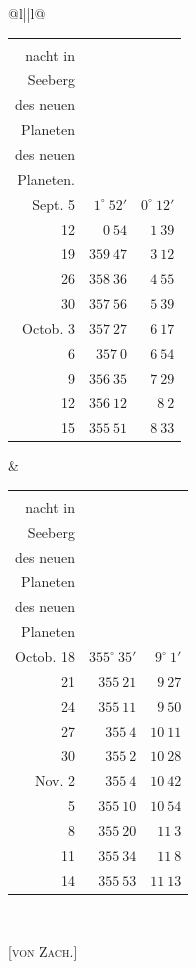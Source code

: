 \begin{center}
\begingroup\fontsize{8.5}{10.5}\selectfont\setlength{\tabcolsep}{2pt}\renewcommand{\arraystretch}{1.12}
\begin{tabular}{@{}l||l@{}}
\begin{tabular}{@{}r|r|r@{}}
\shortstack{Mitter-\\nacht in\\Seeberg} & \shortstack{Gerade Aufst.\\des neuen\\Planeten} & \shortstack{Südl. Abw.\\des neuen\\Planeten.} \\ \hline
Sept. 5 & $1^\circ\ 52'$ & $0^\circ\ 12'$ \\
12 & $0\ 54$ & $1\ 39$ \\
19 & $359\ 47$ & $3\ 12$ \\
26 & $358\ 36$ & $4\ 55$ \\
30 & $357\ 56$ & $5\ 39$ \\
Octob. 3 & $357\ 27$ & $6\ 17$ \\
6 & $357\ 0$ & $6\ 54$ \\
9 & $356\ 35$ & $7\ 29$ \\
12 & $356\ 12$ & $8\ 2$ \\
15 & $355\ 51$ & $8\ 33$ \\
\end{tabular} &
\begin{tabular}{@{}r|r|r@{}}
\shortstack{Mitter-\\nacht in\\Seeberg} & \shortstack{Gerade Aufst.\\des neuen\\Planeten} & \shortstack{Südl. Abw.\\des neuen\\Planeten} \\ \hline
Octob. 18 & $355^\circ\ 35'$ & $9^\circ\ 1'$ \\
21 & $355\ 21$ & $9\ 27$ \\
24 & $355\ 11$ & $9\ 50$ \\
27 & $355\ 4$ & $10\ 11$ \\
30 & $355\ 2$ & $10\ 28$ \\
Nov. 2 & $355\ 4$ & $10\ 42$ \\
5 & $355\ 10$ & $10\ 54$ \\
8 & $355\ 20$ & $11\ 3$ \\
11 & $355\ 34$ & $11\ 8$ \\
14 & $355\ 53$ & $11\ 13$ \\
\end{tabular}\\
\end{tabular}\endgroup
\end{center}

\hfill[\textsc{von Zach.}]
